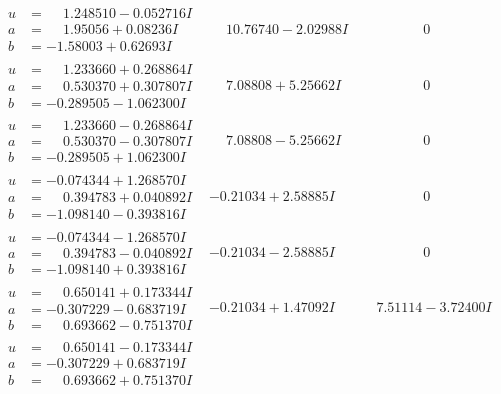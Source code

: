 \documentclass[1p]{elsarticle_modified}
\theoremstyle{definition}
\begin{document}
$$\begin{array}{c|c|c}
\begin{aligned}
u &= \phantom{-}1.248510 - 0.052716 I \\
a &= \phantom{-}1.95056 + 0.08236 I \\
b &= -1.58003 + 0.62693 I\end{aligned}
 & \phantom{-}10.76740 - 2.02988 I & \phantom{-0.000000 } 0 \\ \hline\begin{aligned}
u &= \phantom{-}1.233660 + 0.268864 I \\
a &= \phantom{-}0.530370 + 0.307807 I \\
b &= -0.289505 - 1.062300 I\end{aligned}
 & \phantom{-}7.08808 + 5.25662 I & \phantom{-0.000000 } 0 \\ \hline\begin{aligned}
u &= \phantom{-}1.233660 - 0.268864 I \\
a &= \phantom{-}0.530370 - 0.307807 I \\
b &= -0.289505 + 1.062300 I\end{aligned}
 & \phantom{-}7.08808 - 5.25662 I & \phantom{-0.000000 } 0 \\ \hline\begin{aligned}
u &= -0.074344 + 1.268570 I \\
a &= \phantom{-}0.394783 + 0.040892 I \\
b &= -1.098140 - 0.393816 I\end{aligned}
 & -0.21034 + 2.58885 I & \phantom{-0.000000 } 0 \\ \hline\begin{aligned}
u &= -0.074344 - 1.268570 I \\
a &= \phantom{-}0.394783 - 0.040892 I \\
b &= -1.098140 + 0.393816 I\end{aligned}
 & -0.21034 - 2.58885 I & \phantom{-0.000000 } 0 \\ \hline\begin{aligned}
u &= \phantom{-}0.650141 + 0.173344 I \\
a &= -0.307229 - 0.683719 I \\
b &= \phantom{-}0.693662 - 0.751370 I\end{aligned}
 & -0.21034 + 1.47092 I & \phantom{-}7.51114 - 3.72400 I \\ \hline\begin{aligned}
u &= \phantom{-}0.650141 - 0.173344 I \\
a &= -0.307229 + 0.683719 I \\
b &= \phantom{-}0.693662 + 0.751370 I\end{aligned}

\end{array}$$
\end{document}
